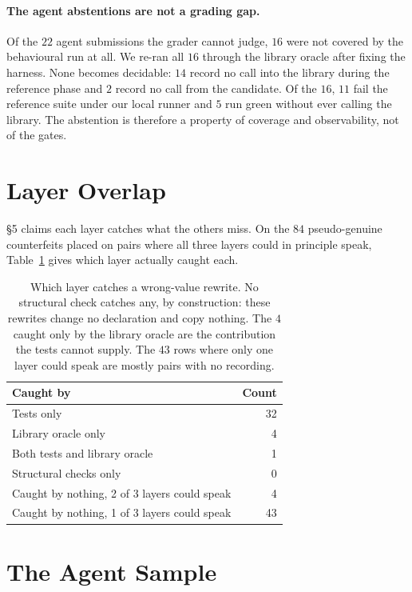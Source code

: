 \paragraph{The agent abstentions are not a grading gap.}
Of the $22$ agent submissions the grader cannot judge, $16$ were not
covered by the behavioural run at all. We re-ran all $16$ through the
library oracle after fixing the harness. None becomes decidable: $14$
record no call into the library during the reference phase and $2$
record no call from the candidate. Of the $16$, $11$ fail the reference
suite under our local runner and $5$ run green without ever calling the
library. The abstention is therefore a property of coverage and
observability, not of the gates.

\section{Layer Overlap}
\label{app:overlap}

\S5 claims each layer catches what the others miss. On the $84$
pseudo-genuine counterfeits placed on pairs where all three layers could
in principle speak, Table~\ref{tab:overlap} gives which layer actually
caught each.

\begin{table}[t]
\centering\small
\begin{tabular}{@{}lr@{}}
\toprule
Caught by & Count \\
\midrule
Tests only & 32 \\
Library oracle only & 4 \\
Both tests and library oracle & 1 \\
Structural checks only & 0 \\
\midrule
Caught by nothing, 2 of 3 layers could speak & 4 \\
Caught by nothing, 1 of 3 layers could speak & 43 \\
\bottomrule
\end{tabular}
\caption{Which layer catches a wrong-value rewrite. No structural check
catches any, by construction: these rewrites change no declaration and
copy nothing. The $4$ caught only by the library oracle are the
contribution the tests cannot supply. The $43$ rows where only one layer
could speak are mostly pairs with no recording.}
\label{tab:overlap}
\end{table}

\section{The Agent Sample}
\label{app:sample}

